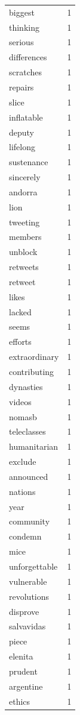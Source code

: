 \begin{tabular}{lr}
biggest & 1 \\
thinking & 1 \\
serious & 1 \\
differences & 1 \\
scratches & 1 \\
repairs & 1 \\
slice & 1 \\
inflatable & 1 \\
deputy & 1 \\
lifelong & 1 \\
sustenance & 1 \\
sincerely & 1 \\
andorra & 1 \\
lion & 1 \\
tweeting & 1 \\
members & 1 \\
unblock & 1 \\
retweets & 1 \\
retweet & 1 \\
likes & 1 \\
lacked & 1 \\
seems & 1 \\
efforts & 1 \\
extraordinary & 1 \\
contributing & 1 \\
dynasties & 1 \\
videos & 1 \\
nomasb & 1 \\
teleclasses & 1 \\
humanitarian & 1 \\
exclude & 1 \\
announced & 1 \\
nations & 1 \\
year & 1 \\
community & 1 \\
condemn & 1 \\
mice & 1 \\
unforgettable & 1 \\
vulnerable & 1 \\
revolutions & 1 \\
disprove & 1 \\
salvavidas & 1 \\
piece & 1 \\
elenita & 1 \\
prudent & 1 \\
argentine & 1 \\
ethics & 1 \\

\end{tabular}
